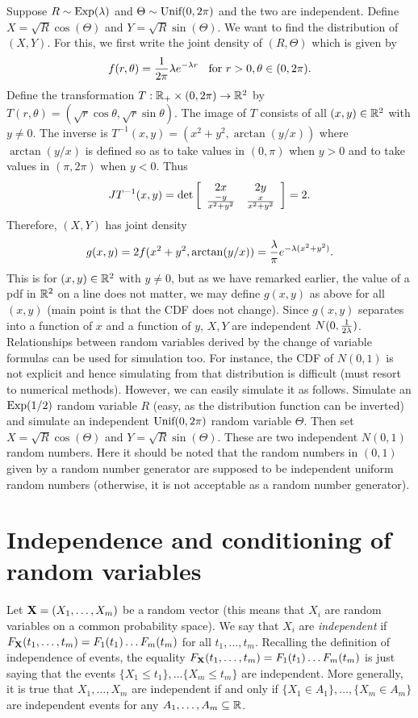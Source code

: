 \documentclass[preprint,  11pt]{amsart}
\def\X{{\bf X}}
\newcommand{\matrices}[4]{\l[\begin{array}{cc} #1 & #2 \\ #3 & #4  \end{array} \r]}
\begin{document}
\beg Suppose $R\sim \mb{Exp}(\lam)$ and $\Theta\sim \mb{Unif}(0,2\pi)$ and the two are independent. Define $X=\sqrt{R}\cos(\Theta)$ and $Y=\sqrt{R}\sin(\Theta)$. We want to find the distribution of $(X,Y)$. For this, we first write the joint density of $(R,\Theta)$ which is given by 
$$
f(r,\theta)=\frac{1}{2\pi}\lam e^{-\lam r} \hsp{2mm}\mb{ for }r>0,\theta\in (0,2\pi).
$$
Define the transformation $T:\R_{+}\times (0,2\pi)\to \R^{2}$ by $T(r,\theta)=(\sqrt{r}\cos\theta,\sqrt{r}\sin \theta)$. The image of $T$ consists of all $(x,y)\in \R^{2}$ with $y\not=0$. The inverse is $T^{-1}(x,y)=(x^{2}+y^{2},\arctan(y/x))$ where $\arctan(y/x)$ is defined so as to take values in $(0,\pi)$ when $y>0$ and to take values in $(\pi,2\pi)$ when $y<0$. Thus
$$
JT^{-1}(x,y) = \det\matrices{2x}{2y}{\frac{-y}{x^{2}+y^{2}}}{\frac{x}{x^{2}+y^{2}}}=2.
$$
Therefore, $(X,Y)$ has joint density 
$$
g(x,y) = 2f(x^{2}+y^{2},\arctan(y/x)) = \frac{\lam}{\pi} e^{-\lam(x^{2}+y^{2})}.
$$
This is for $(x,y)\in \R^{2}$ with $y\not=0$, but as we have remarked earlier, the value of a pdf in $\R^{2}$ on a line does not matter, we may define $g(x,y)$ as above for all $(x,y)$ (main point is that the CDF does not change). Since $g(x,y)$ separates into a function of $x$ and a function of $y$, $X,Y$ are independent $N(0,\frac{1}{2\lam})$. 
\eeg
\berk Relationships between random variables derived by the change of variable formulas can be used for simulation too. For instance, the CDF of $N(0,1)$ is not explicit and hence simulating from that distribution is difficult (must resort to numerical methods). However, we can easily simulate it as follows. Simulate an $\mb{Exp}(1/2)$ random variable $R$ (easy, as the distribution function can be inverted) and simulate an independent $\mb{Unif}(0,2\pi)$ random variable $\Theta$. Then set $X=\sqrt{R}\cos(\Theta)$ and $Y=\sqrt{R}\sin(\Theta)$. These are two independent $N(0,1)$ random numbers. Here it should be noted that the random numbers in $(0,1)$ given by a random number generator are supposed to be independent uniform random numbers (otherwise, it is not acceptable as a random number generator).
\eerk


\section{Independence and conditioning of random variables}
\bdefn Let $\X=(X_{1},\ldots ,X_{m})$ be a random vector (this means that $X_{i}$ are random variables on a common probability space). We say that $X_{i}$ are {\em independent} if $F_{\X}(t_{1},\ldots ,t_{m})=F_{1}(t_{1})\ldots F_{m}(t_{m})$ for all $t_{1},\ldots ,t_{m}$. 
\edefn
\berk Recalling the definition of independence of events, the equality $F_{\X}(t_{1},\ldots ,t_{m})=F_{1}(t_{1})\ldots F_{m}(t_{m})$ is just saying that the events $\{X_{1}\le t_{1}\}, \ldots \{X_{m}\le t_{m}\}$ are independent. More generally, it is true that $X_{1},\ldots ,X_{m}$ are independent if and only if $\{X_{1}\in A_{1}\},\ldots ,\{X_{m}\in A_{m}\}$ are independent events for any $A_{1},\ldots, A_{m}\subseteq \R$.
\eerk
\end{document}
